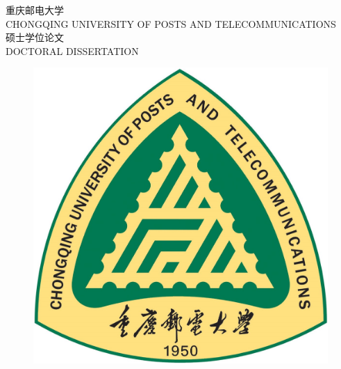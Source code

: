 

\begin{center}

\begin{spacing}{1.0}
	\vspace{10mm}
\erhao 重\hspace{12pt}庆\hspace{12pt}邮\hspace{12pt}电\hspace{12pt}大\hspace{12pt}学\\
\xiaosi CHONGQING UNIVERSITY OF POSTS AND TELECOMMUNICATIONS
\\ [20mm]

\chuhao 硕士学位论文\\
\sanhao DOCTORAL DISSERTATION



\end{spacing}

\vspace{20mm}

        
        \begin{figure}[h]
        	\centering
        	\includegraphics[scale=0.5]{chapters/logo2.jpg}
        \end{figure}
\end{center}

